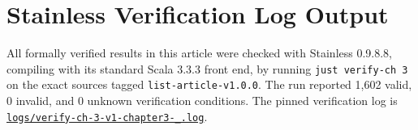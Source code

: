 \section{Stainless Verification Log Output}
\label{sec:appendix-b}

All formally verified results in this article were checked with Stainless
0.9.8.8, compiling with its standard Scala 3.3.3 front end, by running
\texttt{just verify-ch 3} on the exact sources tagged
\texttt{list-article-v1.0.0}. The run reported 1,602 valid, 0 invalid,
and 0 unknown verification conditions. The pinned verification log is
\href{https://github.com/thiagomata/prime-numbers/blob/list-article-v1.0.0/logs/verify-ch-3-v1-chapter3-_.log}{\texttt{logs/verify-ch-3-v1-chapter3-\_.log}}.
